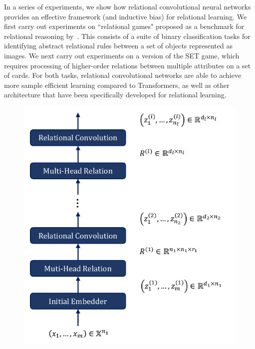 In a series of experiments, we show how relational convolutional neural networks provides an effective framework (and inductive bias) for relational learning. 
We first carry out experiments on ``relational games" 
proposed as a benchmark for relational reasoning by~\citep{shanahanExplicitlyRelationalNeural}. This consists of 
a suite of binary classification tasks for identifying abstract relational rules between a set of objects represented as images. We next carry out experiments 
on a version of the SET game, which requires processing of  higher-order relations 
between multiple attributes on a set of cards. For both tasks, relational 
convolutional networks are able to achieve more sample efficient learning compared  
to Transformers, as well as other architecture that have been specifically developed 
for relational learning. 





\begin{figure}[!ht]
    \centering
    \includegraphics{figs/relconv_architecture.pdf}
    \caption{}\label{fig:relconv_architecture}
\end{figure}